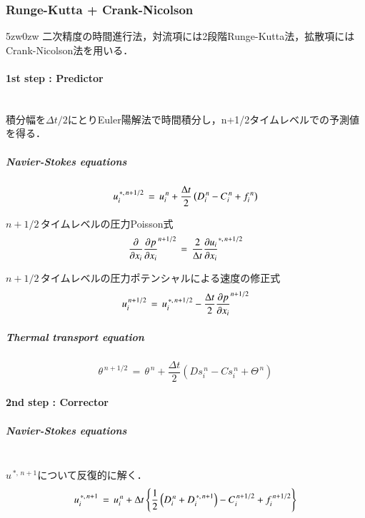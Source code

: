 \subsubsection{Runge-Kutta + Crank-Nicolson}
\begin{indentation}{5zw}{0zw}
二次精度の時間進行法，対流項には2段階Runge-Kutta法，拡散項にはCrank-Nicolson法を用いる．

\paragraph{1st step : Predictor} $\mbox{}$\\
積分幅を$\Delta t/2$にとりEuler陽解法で時間積分し，n+1/2タイムレベルでの予測値を得る．

\subparagraph{Navier-Stokes equations}

\begin{equation}
u_i^{\,*,\,n+1/2} \,=\, u_i^{\,n} + \frac{\Delta t}{2} \left( D_i^{\,n} - C_i^{\,n} + f_i^{\,n} \right) \vspace{2mm}
\label{eq:pseudo vector RKCN predictor}
\end{equation}

$n+1/2\,$タイムレベルの圧力Poisson式
\begin{equation}
\frac{\partial}{\partial x_i} {\frac{\partial p}{\partial x_i}}^{n+1/2}
\,=\,
\frac{2}{\Delta t} {\frac{\partial u_i}{\partial x_i}}^{*,\,n+1/2} \vspace{2mm}
\label{eq:Poisson RKCN predictor}
\end{equation}

$n+1/2\,$タイムレベルの圧力ポテンシャルによる速度の修正式
\begin{equation}
u_i^{\,n+1/2} \,=\, u_i^{\,*,\,n+1/2} - \frac{\Delta t}{2} {\frac{\partial p}{\partial x_i}}^{n+1/2} \vspace{2mm}
\label{eq:1st Pressure correction RKCN predictor}
\end{equation}

\subparagraph{Thermal transport equation}

\begin{equation}
\theta^{\,n+1/2} \,=\, \theta^{\,n} + \frac{\Delta t}{2} \left( Ds_i^{\,n} - Cs_i^{\,n} + \Theta^{\,n} \right)
\label{eq:thermal transport RKCN predictor}
\end{equation}


\paragraph{2nd step : Corrector}
\subparagraph{Navier-Stokes equations} $\mbox{}$\\
$u^{\,*,\,n+1}$について反復的に解く．
\begin{equation}
u_i^{\,*,\,n+1} \,=\, u_i^{\,n} + \Delta t \left\{ \frac{1}{2} \left( D_i^{\,n} + D_i^{\,*,\,n+1} \right) - C_i^{\,n+1/2} + f_i^{\,n+1/2} \right\} \vspace{2mm}
\label{eq:pseudo vector RKCN corrector}
\end{equation}



\end{indentation}
